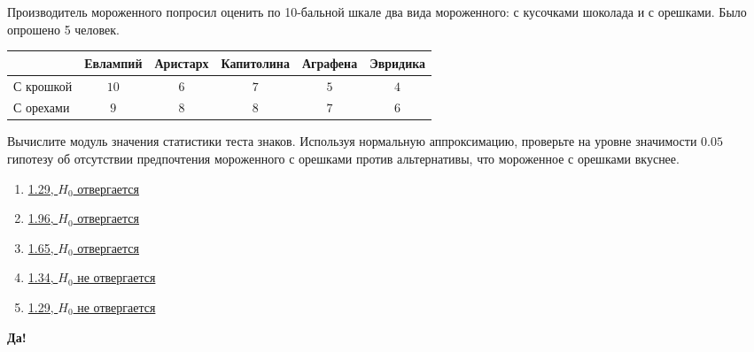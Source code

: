 \documentclass[t]{beamer}
\begin{document}
 \begin{frame} \label{31-Yes} 
\begin{block}{31} 
\small
 Производитель мороженного попросил оценить по 10-бальной шкале два вида мороженного: с кусочками шоколада и с орешками. Было опрошено 5 человек.


 \begin{tabular}{@{}lccccc@{}}
 \toprule
           & Евлампий & Аристарх & Капитолина & Аграфена & Эвридика \\ \midrule
 С крошкой & $10$     & $6$      & $7$        & $5$      & $4$      \\
 С орехами & $9$      & $8$      & $8$        & $7$      & $6$      \\ \bottomrule
 \end{tabular}


Вычислите модуль значения статистики теста знаков. Используя нормальную аппроксимацию, проверьте на уровне значимости $0.05$ гипотезу об отсутствии предпочтения мороженного с орешками против альтернативы, что мороженное с орешками вкуснее.
 


 \end{block} 
\begin{enumerate} 
\item[] \hyperlink{31-No}{\beamergotobutton{} 1.29, $H_0$ отвергается}
\item[] \hyperlink{31-No}{\beamergotobutton{} 1.96, $H_0$ отвергается}
\item[] \hyperlink{31-No}{\beamergotobutton{} 1.65, $H_0$ отвергается}
\item[] \hyperlink{31-Yes}{\beamergotobutton{} 1.34, $H_0$ не отвергается}
\item[] \hyperlink{31-No}{\beamergotobutton{} 1.29, $H_0$ не отвергается}
\end{enumerate} 

 \textbf{Да!} 
 \hyperlink{32}{}\end{frame} 
\end{document}

